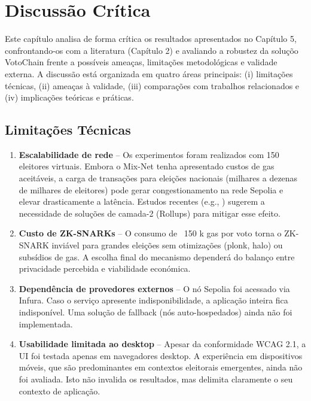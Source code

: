 \chapter{Discuss{\~a}o Cr{\'i}tica}
\label{cap6}
\justifying

{\sloppy Este cap{\'i}tulo analisa de forma cr{\'i}tica os resultados apresentados no Cap{\'i}tulo 5, confrontando-os com a literatura (Cap{\'i}tulo 2) e avaliando a robustez da solu{\c{c}}{\~o}o VotoChain frente a poss{\'i}veis amea{\c{c}}as, limita{\c{c}}{\~o}es metodol{\'o}gicas e validade externa. A discuss{\~a}o est{\'a} organizada em quatro {\'a}reas principais: (i) limita{\c{c}}{\~o}es t{\'e}cnicas, (ii) amea{\c{c}}as {\`a} validade, (iii) compara{\c{c}}{\~o}es com trabalhos relacionados e (iv) implica{\c{c}}{\~o}es te{\'o}ricas e pr{\'a}ticas.\par}

\section{Limitações Técnicas}
\begin{enumerate}
    \item \textbf{Escalabilidade de rede} – Os experimentos foram realizados com 150 eleitores virtuais. Embora o Mix-Net tenha apresentado custos de gas aceitáveis, a carga de transações para eleições nacionais (milhares a dezenas de milhares de eleitores) pode gerar congestionamento na rede Sepolia e elevar drasticamente a latência. Estudos recentes (e.g., \cite{hajian_berenjestanaki_blockchain-based_2024}) sugerem a necessidade de soluções de camada-2 (Rollups) para mitigar esse efeito.
    \item \textbf{Custo de ZK-SNARKs} – O consumo de ~150 k gas por voto torna o ZK-SNARK invi{\'a}vel para grandes elei{\c{c}}{\~o}es sem otimiza{\c{c}}{\~o}es (plonk, halo) ou subs{\'i}dios de gas. A escolha final do mecanismo depender{\'a} do balan{\c{c}}o entre privacidade percebida e viabilidade econ{\'o}mica.
    \item \textbf{Dependência de provedores externos} – O nó Sepolia foi acessado via Infura. Caso o serviço apresente indisponibilidade, a aplicação inteira fica indisponível. Uma solução de fallback (nós auto-hospedados) ainda não foi implementada.
    \item \textbf{Usabilidade limitada ao desktop} – Apesar da conformidade WCAG 2.1, a UI foi testada apenas em navegadores desktop. A experiência em dispositivos móveis, que são predominantes em contextos eleitorais emergentes, ainda não foi avaliada. Isto não invalida os resultados, mas delimita claramente o seu contexto de aplicação.
\end{enumerate}

